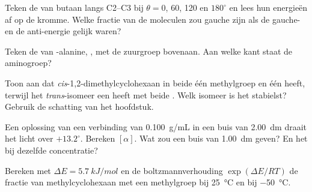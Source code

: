 \begin{exercise}[$\star\star$]\label{exo:b1:stereochemistry-in-depth:5}
Teken de  van butaan langs C2--C3 bij $\theta = 0$, 60,
120 en $180^\circ$ en lees hun energieën af op de kromme. Welke fractie
van de moleculen zou gauche zijn als de gauche- en de anti-energie gelijk
waren?
\end{exercise}

\begin{exercise}[$\star\star$]\label{exo:b1:stereochemistry-in-depth:6}
Teken de  van -alanine,
, met de zuurgroep bovenaan. Aan welke kant staat de
aminogroep?
\end{exercise}

\begin{exercise}[$\star\star$]\label{exo:b1:stereochemistry-in-depth:7}
Toon aan dat \textit{cis}-1,2-dimethylcyclohexaan in beide  één
methylgroep  en één  heeft, terwijl het
\textit{trans}-isomeer een  heeft met beide . Welk
isomeer is het stabielst? Gebruik de schatting van het hoofdstuk.
\end{exercise}

\begin{exercise}[$\star\star$]\label{exo:b1:stereochemistry-in-depth:8}
Een oplossing van een  verbinding van \qty{0.100}{g/mL} in een
buis van \qty{2.00}{dm} draait het licht over $+13.2^\circ$. Bereken
$[\alpha]$. Wat zou een buis van \qty{1.00}{dm} geven? En het 
bij dezelfde concentratie?
\end{exercise}

\begin{exercise}[$\star\star$]\label{exo:b1:stereochemistry-in-depth:9}
Bereken met $\Delta E = \qty{5.7}{kJ/mol}$ en de boltzmannverhouding
$\exp(\Delta E/RT)$ de fractie  van methylcyclohexaan met een
 methylgroep bij \qty{25}{\celsius} en bij
\qty{-50}{\celsius}.
\end{exercise}

